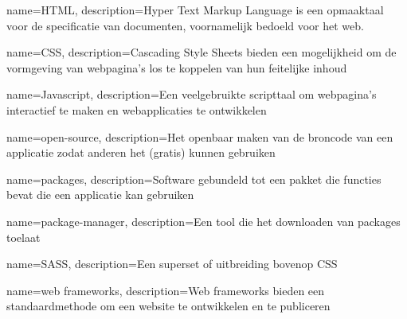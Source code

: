 

\makeglossaries

{
    name=HTML,
    description={Hyper Text Markup Language is een opmaaktaal voor de specificatie van documenten, voornamelijk bedoeld voor het web.}
}

{
    name=CSS,
    description={Cascading Style Sheets bieden een mogelijkheid om de vormgeving van webpagina's los te koppelen van hun feitelijke inhoud}
}

{
    name=Javascript,
    description={Een veelgebruikte scripttaal om webpagina's interactief te maken en webapplicaties te ontwikkelen}
}

{
    name=open-source,
    description={Het openbaar maken van de broncode van een applicatie zodat anderen het (gratis) kunnen gebruiken}
}

{
    name=packages,
    description={Software gebundeld tot een pakket die functies bevat die een applicatie kan gebruiken}
}

{
    name=package-manager,
    description={Een tool die het downloaden van packages toelaat}
}

{
    name=SASS,
    description={Een superset of uitbreiding bovenop CSS}
}

{
    name=web frameworks,
    description={Web frameworks bieden een standaardmethode om een website te ontwikkelen en te publiceren}
}